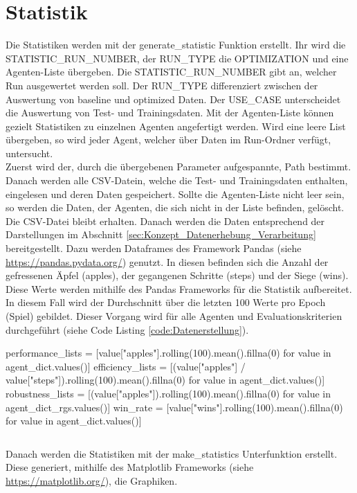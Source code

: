 \section{Statistik} \label{sec:Implementierung_Statistiken}
Die Statistiken werden mit der generate\_statistic Funktion erstellt. Ihr wird die STATISTIC\_RUN\_NUMBER, der RUN\_TYPE die OPTIMIZATION und eine Agenten-Liste übergeben. Die STATISTIC\_RUN\_NUMBER gibt an, welcher Run ausgewertet werden soll. Der RUN\_TYPE differenziert zwischen der Auswertung von baseline und optimized Daten. Der USE\_CASE unterscheidet die Auswertung von Test- und Trainingsdaten. Mit der Agenten-Liste können gezielt Statistiken zu einzelnen Agenten angefertigt werden. Wird eine leere List übergeben, so wird jeder Agent, welcher über Daten im Run-Ordner verfügt, untersucht.\\
Zuerst wird der, durch die übergebenen Parameter aufgespannte, Path bestimmt. Danach werden alle CSV-Datein, welche die Test- und Trainingsdaten enthalten, eingelesen und deren Daten gespeichert. Sollte die Agenten-Liste nicht leer sein, so werden die Daten, der Agenten, die sich nicht in der Liste befinden, gelöscht. Die CSV-Datei bleibt erhalten.
Danach werden die Daten entsprechend der Darstellungen im Abschnitt \ref{sec:Konzept_Datenerhebung_Verarbeitung} bereitgestellt. Dazu werden Dataframes des Framework Pandas (siehe \url{https://pandas.pydata.org/}) genutzt. In diesen befinden sich die Anzahl der gefressenen Äpfel (apples), der gegangenen Schritte (steps) und der Siege (wins). Diese Werte werden mithilfe des Pandas Frameworks für die Statistik aufbereitet. In diesem Fall wird der Durchschnitt über die letzten 100 Werte pro Epoch (Spiel) gebildet. Dieser Vorgang wird für alle Agenten und Evaluationskriterien durchgeführt (siehe Code Listing \ref{code:Datenerstellung}).
\begin{python}
performance_lists = [value["apples"].rolling(100).mean().fillna(0) for value in agent_dict.values()]
efficiency_lists = [(value["apples"] / value["steps"]).rolling(100).mean().fillna(0) for value in agent_dict.values()]
robustness_lists = [(value["apples"]).rolling(100).mean().fillna(0) for value in agent_dict_rgs.values()]
win_rate = [value["wins"].rolling(100).mean().fillna(0) for value in agent_dict.values()]
\end{python}
\begin{lstlisting}[caption=Erstellung der Daten entsprechende der Evaluationskriterien, label=code:Datenerstellung]
\end{lstlisting}
Danach werden die Statistiken mit der make\_statistics Unterfunktion erstellt.
Diese generiert, mithilfe des Matplotlib Frameworks (siehe \url{https://matplotlib.org/}), die Graphiken.